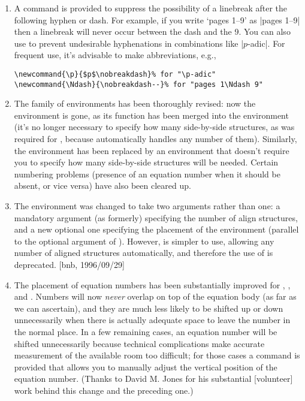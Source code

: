 \documentclass{amsdtx}
\begin{document}
\begin{enumerate}
\item A command  is provided to suppress the possibility
of a linebreak after the following hyphen or dash. For example, if you
write `pages 1--9' as |pages 1\nobreakdash--9| then a linebreak will
never occur between the dash and the 9. You can also use
 to prevent undesirable hyphenations in combinations
like |$p$-adic|. For frequent use, it's advisable to make abbreviations,
e.g.,
\begin{verbatim}
\newcommand{\p}{$p$\nobreakdash}% for "\p-adic"
\newcommand{\Ndash}{\nobreakdash--}% for "pages 1\Ndash 9"
\end{verbatim}

\item The  family of environments has been thoroughly
revised: now the  environment is gone, as its function has
been merged into the  environment (it's no longer necessary
to specify how many side-by-side structures, as was required for
, because  automatically handles any number of
them). Similarly, the  environment has been replaced by
an environment  that doesn't require you to specify how
many side-by-side structures will be needed. Certain numbering problems
(presence of an equation number when it should be absent, or vice versa)
have also been cleared up.

\item The  environment was changed to take two arguments
rather than one: a mandatory argument (as formerly) specifying the number
of align structures, and a new optional one specifying the placement of
the environment (parallel to the optional argument of ).
However,  is simpler to use, allowing any number of aligned
structures automatically, and therefore the use of  is
deprecated.  [bnb, 1996/09/29]

\item The placement of equation numbers has been substantially improved
for , , and . Numbers will now
\emph{never} overlap on top of the equation body (as far as we can
ascertain), and they are much less likely to be shifted up or down
unnecessarily when there is actually adequate space to leave the number
in the normal place. In a few remaining cases, an equation number will
be shifted unnecessarily because technical complications make accurate
measurement of the available room too difficult; for those cases a
 command is provided that allows you to manually adjust the
vertical position of the equation number. (Thanks to David M. Jones for
his substantial [volunteer] work behind this change and the preceding
one.)


\end{enumerate}
\end{document}
